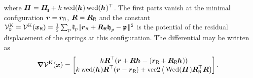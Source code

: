 where $\bodyMOS{}{} = \bodyMOSs{}{} + \bodyStiffness{}{} \wedOp(\bodyCOS{}{}) \wedOp(\bodyCOS{}{})^\top$.
The first parts vanish at the minimal configuration $\boldsymbol{r}=\boldsymbol{r}_{\mathsf{R}}$, $\boldsymbol{R}=\boldsymbol{R}_{\mathsf{R}}$ and the constant $\mathcal{V}^{\mathrm{K}}_0 = \mathcal{V}^{\mathrm{K}}(\boldsymbol{x}_{\mathsf{R}}) = \tfrac{1}{2} \sum\nolimits_{p} \mathfrak{k}_{p} \| \boldsymbol{r}_{\mathsf{R}} + \boldsymbol{R}_{\mathsf{R}}\boldsymbol{\mathfrak{h}}_{p} - \boldsymbol{\mathfrak{p}}_{} \|_{}^2$ is the potential of the residual displacement of the springs at this configuration.
The differential may be written as
\begin{align}\label{eq:RBStiffnessForce}
 \differential\potentialStiff(\sysCoord) = 
 \begin{bmatrix} 
   \bodyStiffness{}{} \R^\top (\r + \R\bodyCOS{}{} - (\rR + \RR\bodyCOS{}{})) \\
   \bodyStiffness{}{}\wedOp(\bodyCOS{}{}) \R^\top (\r-\rR) + \veeTwoOp\big(\wedMatOp(\bodyMOS{}{}) \RR^\top\R\big)
 \end{bmatrix}.
\end{align}
